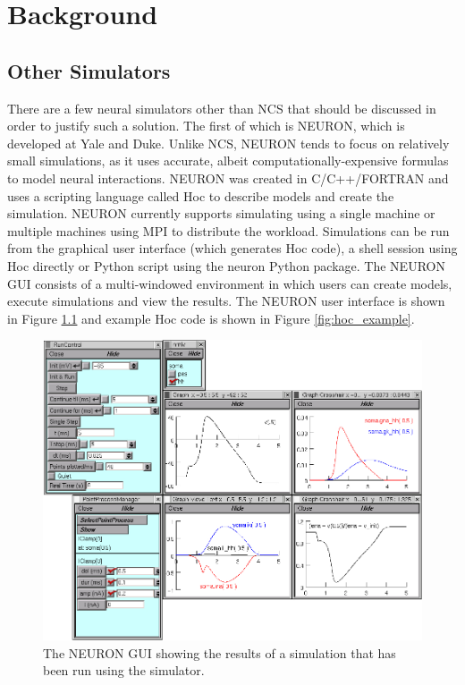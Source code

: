 \chapter{Background}
\label{chapter:background}

\section{Other Simulators}

There are a few neural simulators other than NCS that should be discussed in order to justify such a solution. The first of which is NEURON\cite{brette2007simulation}, which is developed at Yale and Duke. Unlike NCS, NEURON tends to focus on relatively small simulations, as it uses accurate, albeit computationally-expensive formulas to model neural interactions. NEURON was created in C/C++/FORTRAN and uses a scripting language called Hoc to describe models and create the simulation. NEURON currently supports simulating using a single machine or multiple machines using MPI to distribute the workload. Simulations can be run from the graphical user interface (which generates Hoc code), a shell session using Hoc directly or Python script using the neuron Python package. The NEURON GUI consists of a multi-windowed environment in which users can create models, execute simulations and view the results\cite{brette2007simulation}. The NEURON user interface is shown in Figure \ref{fig:neuron_gui} and example Hoc code is shown in Figure \ref{fig:hoc_example}\cite{brette2007simulation, carenvale2006neuron}.


\begin{figure}
\begin{center}
\includegraphics[height=\textheight,width=5in,keepaspectratio]{figures/neuron_gui.jpg}
\caption[The NEURON GUI \cite{brette2007simulation}]{The NEURON GUI showing the results of a simulation that has been run using the simulator\cite{brette2007simulation}.\label{fig:neuron_gui}}
\end{center}
\end{figure}

